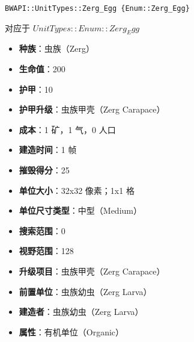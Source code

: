 \begin{tcolorbox}[colback=white, colframe=black!60!white, title=Zerg\_Egg(), arc=0mm]
    \begin{verbatim}
BWAPI::UnitTypes::Zerg_Egg {Enum::Zerg_Egg}
    \end{verbatim}
    对应于  $ UnitTypes::Enum::Zerg_Egg $ 
    \begin{itemize}
        \item \textbf{种族}：虫族（Zerg）
        \item \textbf{生命值}：200
        \item \textbf{护甲}：10
        \item \textbf{护甲升级}：虫族甲壳（Zerg Carapace）
        \item \textbf{成本}：1 矿，1 气，0 人口
        \item \textbf{建造时间}：1 帧
        \item \textbf{摧毁得分}：25
        \item \textbf{单位大小}：32x32 像素；1x1 格
        \item \textbf{单位尺寸类型}：中型（Medium）
        \item \textbf{搜索范围}：0
        \item \textbf{视野范围}：128
        \item \textbf{升级项目}：虫族甲壳（Zerg Carapace）
        \item \textbf{前置单位}：虫族幼虫（Zerg Larva）
        \item \textbf{建造者}：虫族幼虫（Zerg Larva）
        \item \textbf{属性}：有机单位（Organic）
    \end{itemize}
\end{tcolorbox}

